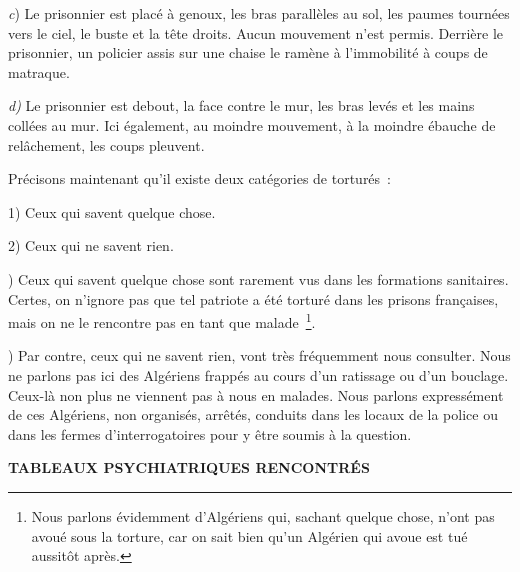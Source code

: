 \documentclass[french,twoside]{book} %
\begin{document}
\emph{c}) Le prisonnier est placé à genoux, les bras parallèles au sol, les paumes tournées vers le ciel, le buste et la tête droits. Aucun mouvement n’est permis. Derrière le prisonnier, un policier assis sur une chaise le ramène à l’immobilité à coups de matraque.\par
\emph{d)} Le prisonnier est debout, la face contre le mur, les bras levés et les mains collées au mur. Ici également, au moindre mouvement, à la moindre ébauche de relâchement, les coups pleuvent.\par
\bigbreak
\noindent Précisons maintenant qu’il existe deux catégories de torturés :\par
1) Ceux qui savent quelque chose.\par
2) Ceux qui ne savent rien.\par
\bigbreak
{}) Ceux qui savent quelque chose sont rarement vus dans les formations sanitaires. Certes, on n’ignore pas que tel patriote a été torturé dans les prisons françaises, mais on ne le rencontre pas en tant que malade \footnote{Nous parlons évidemment d’Algériens qui, sachant quelque chose, n’ont pas avoué sous la torture, car on sait bien qu’un Algérien qui avoue est tué aussitôt après.}.\par
\bigbreak
{}) Par contre, ceux qui ne savent rien, vont très fréquemment nous consulter. Nous ne parlons pas ici des Algériens frappés au cours d’un ratissage ou d’un bouclage. Ceux-là non plus ne viennent pas à nous en malades. Nous parlons expressément de ces Algériens, non organisés, arrêtés, conduits dans les locaux   de la police ou dans les fermes d’interrogatoires pour y être soumis à la question.\par
\bigbreak

\begin{center}
\noindent \textbf{TABLEAUX PSYCHIATRIQUES RENCONTRÉS}\par
\end{center}
\end{document}
